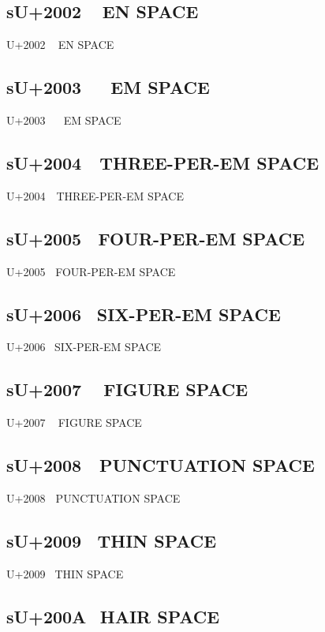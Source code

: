 \subsection{sU+2002   EN SPACE}

U+2002   EN SPACE

\subsection{sU+2003   EM SPACE}

U+2003   EM SPACE

\subsection{sU+2004   THREE-PER-EM SPACE}

U+2004   THREE-PER-EM SPACE

\subsection{sU+2005   FOUR-PER-EM SPACE}

U+2005   FOUR-PER-EM SPACE

\subsection{sU+2006   SIX-PER-EM SPACE}

U+2006   SIX-PER-EM SPACE

\subsection{sU+2007   FIGURE SPACE}

U+2007   FIGURE SPACE

\subsection{sU+2008   PUNCTUATION SPACE}

U+2008   PUNCTUATION SPACE

\subsection{sU+2009   THIN SPACE}

U+2009   THIN SPACE

\subsection{sU+200A   HAIR SPACE}

